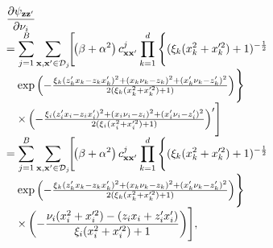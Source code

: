 \documentclass[conference]{IEEEtran}
\begin{document}
	\begin{equation*}
		\hspace{-1.7mm}
		\begin{array}{l}
			\displaystyle\dfrac{\partial\psi_\mathbf{zz^\prime}}{\partial\nu_i}\\
			=\displaystyle\sum_{j=1}^{B}\sum_{\mathbf{x},\mathbf{x}^\prime\in\mathcal{D}_j}\hspace{-0.5mm}\Biggl[\hspace{-0.5mm}\left(\beta+\alpha^2\right) c^{j}_{\mathbf{x}\mathbf{x}^\prime}\prod_{k=1}^{d}\Bigg\{(\xi_k(x_{k}^2+x_{k}^{\prime2})+1)^{-\frac{1}{2}}\\
			\quad\exp\left(-\frac{\xi_k(z^\prime_{k}x_{k}-z_{k}x^\prime_{k})^2+(x_{k}\nu_k-z_{k})^2+(x^\prime_{k}\nu_k-z^\prime_{k})^2}{2(\xi_k(x_{k}^2+x_{k}^{\prime 2})+1)}\right)\hspace{-0.5mm}\Bigg\}\\
			\quad\times\left(-\frac{\xi_i(z^\prime_{i}x_{i}-z_{i}x^\prime_{i})^2+(x_{i}\nu_i-z_{i})^2+(x^\prime_{i}\nu_i-z^\prime_{i})^2}{2(\xi_i(x_{i}^2+x_{i}^{\prime 2})+1)}\right)^\prime\Biggr]\\
			\displaystyle=\sum\limits_{j=1}^{B}\sum\limits_{\mathbf{x},\mathbf{x}^\prime\in\mathcal{D}_j}\hspace{-0.5mm}\Biggl[\hspace{-0.5mm}\left(\beta+\alpha^2\right) c^{j}_{\mathbf{x}\mathbf{x}^\prime}\prod_{k=1}^{d}\Bigg\{(\xi_k(x_{k}^2+x_{k}^{\prime2})+1)^{-\frac{1}{2}}\\
			\quad\exp\left(-\frac{\xi_k(z^\prime_{k}x_{k}-z_{k}x^\prime_{k})^2+(x_{k}\nu_k-z_{k})^2+(x^\prime_{k}\nu_k-z^\prime_{k})^2}{2(\xi_k(x_{k}^2+x_{k}^{\prime 2})+1)}\right)\hspace{-0.5mm}\Bigg\}\\
			\quad\times\left(-\dfrac{\nu_i(x_{i}^2+x_{i}^{\prime2})-(z_{i}x_{i}+z^\prime_{i}x_{i}^\prime)}{\xi_i(x_{i}^2+x_{i}^{\prime2})+1}\right)\Biggr],
		\end{array}
	\end{equation*}
\end{document}
